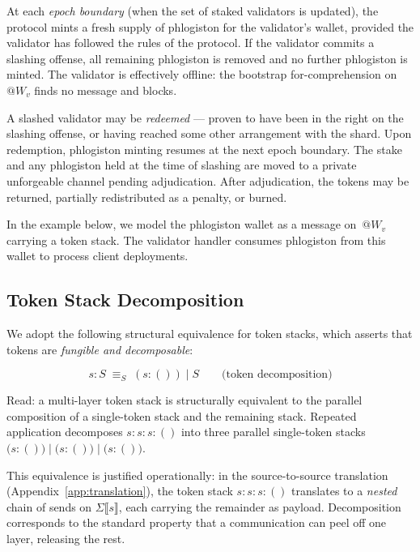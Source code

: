 \documentclass[11pt,a4paper]{article}
\makeatletter
\newcommand{\lsem}{\llbracket}
\newcommand{\rsem}{\rrbracket}
\newcommand{\Par}{\mathbin{|}}
\newcommand{\quot}[1]{@#1}
\newcommand{\Seq}{\equiv_{\!S}}
\makeatother
\begin{document}
At each \emph{epoch boundary} (when the set of staked
validators is updated), the protocol mints a fresh supply of
phlogiston for the validator's wallet, provided the validator
has followed the rules of the protocol.  If the validator
commits a slashing offense, all remaining phlogiston is
removed and no further phlogiston is minted.  The validator
is effectively offline: the bootstrap for-comprehension
on~$\quot{W_v}$ finds no message and blocks.

A slashed validator may be \emph{redeemed} --- proven to have
been in the right on the slashing offense, or having reached
some other arrangement with the shard.  Upon redemption,
phlogiston minting resumes at the next epoch boundary.  The
stake and any phlogiston held at the time of slashing are
moved to a private unforgeable channel pending adjudication.
After adjudication, the tokens may be returned, partially
redistributed as a penalty, or burned.

In the example below, we model the phlogiston wallet as a
message on~$\quot{W_v}$ carrying a token stack.  The
validator handler consumes phlogiston from this wallet to
process client deployments.

\subsection{Token Stack Decomposition}
\label{app:ex-decomp}

We adopt the following structural equivalence for token stacks,
which asserts that tokens are \emph{fungible and decomposable}:

\begin{equation}
  s : S
  \;\Seq\;
  (s : ()) \Par S
  \qquad\text{(token decomposition)}
  \label{eq:token-decomp}
\end{equation}

\noindent
Read: a multi-layer token stack is structurally equivalent to
the parallel composition of a single-token stack and the
remaining stack.  Repeated application decomposes
$s : s : s : ()$ into three parallel single-token stacks
$\bigl(s : ()\bigr) \Par \bigl(s : ()\bigr) \Par
\bigl(s : ()\bigr)$.

This equivalence is justified operationally: in the
source-to-source translation
(Appendix~\ref{app:translation}), the token stack
$s : s : s : ()$ translates to a \emph{nested} chain of
sends on $\Sigma\lsem s \rsem$, each carrying the remainder
as payload.  Decomposition corresponds to the standard
property that a communication can peel off one layer,
releasing the rest.
\end{document}
